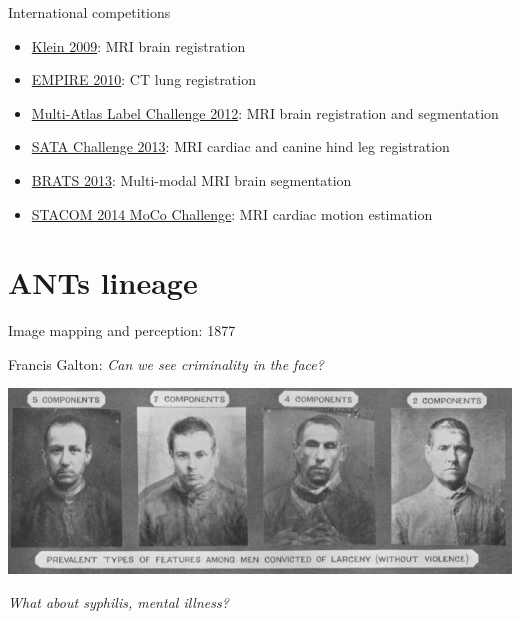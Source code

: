 \documentclass[ignorenonframetext,]{beamer}
\begin{document}
\begin{frame}{International competitions}

\begin{itemize}
\item
  \href{http://www.ncbi.nlm.nih.gov/pubmed/19195496}{Klein 2009}: MRI
  brain registration
\item
  \href{http://empire10.isi.uu.nl}{EMPIRE 2010}: CT lung registration
\item
  \href{https://masi.vuse.vanderbilt.edu/workshop2012/index.php/Main_Page}{Multi-Atlas
  Label Challenge 2012}: MRI brain registration and segmentation
\item
  \href{https://masi.vuse.vanderbilt.edu/workshop2013/index.php/MICCAI_2013_SATA_Challenge_and_Workshop:Current_events}{SATA
  Challenge 2013}: MRI cardiac and canine hind leg registration
\item
  \href{http://martinos.org/qtim/miccai2013/}{BRATS 2013}: Multi-modal
  MRI brain segmentation
\item
  \href{http://www.cardiacatlas.org/web/stacom2014/moco-introduction}{STACOM
  2014 MoCo Challenge}: MRI cardiac motion estimation
\end{itemize}

\end{frame}

\section{ANTs lineage}\label{ants-lineage}

\begin{frame}{Image mapping and perception: 1877}

Francis Galton: \emph{Can we see criminality in the face?}

\includegraphics{./figures/galton.png}

\emph{What about syphilis, mental illness?}

\end{frame}
\end{document}
